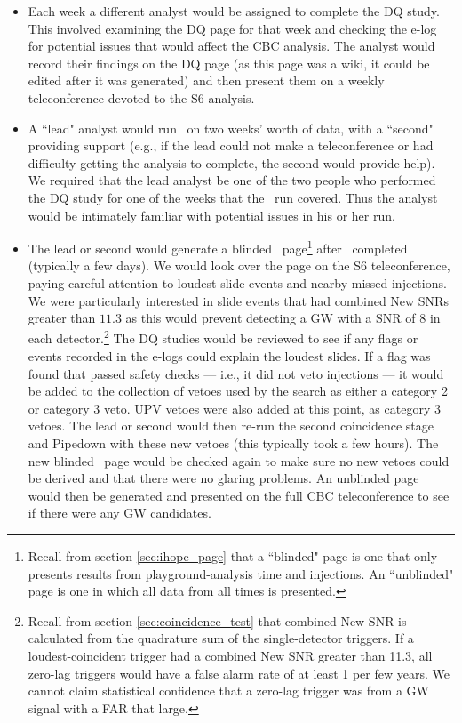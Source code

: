 \begin{itemize}

\item{Each week a different analyst would be assigned to complete the \ac{DQ}
study. This involved examining the DQ page for that week and checking the e-log
for potential issues that would affect the \ac{CBC} analysis. The analyst would
record their findings on the DQ page (as this page was a wiki, it could be
edited after it was generated) and then present them on a weekly teleconference
devoted to the S6 analysis.}

\item{A ``lead" analyst would run \ihope~on two weeks' worth of data, with a
``second" providing support (e.g., if the lead could not make a teleconference
or had difficulty getting the analysis to complete, the second would provide
help). We required that the lead analyst be one of the two people who performed
the DQ study for one of the weeks that the \ihope~run covered. Thus the analyst
would be intimately familiar with potential issues in his or her run.}

\item{The lead or second would generate a blinded \ihope~page\footnote{Recall
from section \ref{sec:ihope_page} that a ``blinded" page is one that only
presents results from playground-analysis time and injections. An ``unblinded"
page is one in which all data from all times is presented.} after
\ihope~completed (typically a few days). We would look over the page on the S6
teleconference, paying careful attention to loudest-slide events and nearby
missed injections. We were particularly interested in slide events that had
combined New \acp{SNR} greater than $11.3$ as this would prevent detecting a
\ac{GW} with a \ac{SNR} of $8$ in each detector.\footnote{Recall from section
\ref{sec:coincidence_test} that combined New SNR is calculated from the
quadrature sum of the single-detector triggers. If a loudest-coincident trigger
had a combined New SNR greater than 11.3, all zero-lag triggers would have a
false alarm rate of at least 1 per few years. We cannot claim statistical
confidence that a zero-lag trigger was from a GW signal with a FAR that large.}
The DQ studies would be reviewed to see if any flags or events recorded in the
e-logs could explain the loudest slides. If a flag was found that passed safety
checks --- i.e., it did not veto injections --- it would be added to the
collection of vetoes used by the search as either a category 2 or category 3
veto. UPV vetoes were also added at this point, as category 3 vetoes. The lead
or second would then re-run the second coincidence stage and Pipedown with
these new vetoes (this typically took a few hours). The new blinded \ihope~page
would be checked again to make sure no new vetoes could be derived and that
there were no glaring problems. An unblinded page would then be generated and
presented on the full \ac{CBC} teleconference to see if there were any \ac{GW}
candidates.}


\end{itemize}
